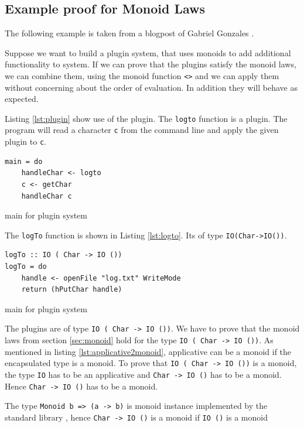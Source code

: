 \documentclass[twoside, a4paper]{article}
\begin{document}
\subsection{Example proof for Monoid Laws}
\label{sec:example}

The following example is taken from a blogpost of Gabriel Gonzales \cite{gonzales14}. 

Suppose we want to build a plugin system, that uses monoids to add additional functionality to system. If we can prove that the plugins satisfy the monoid laws, we can combine them, using the monoid function \verb|<>| and we can apply them without concerning about the order of evaluation. In addition they will behave as expected. 

Listing \ref{lst:plugin} show use of the plugin. The \verb|logto| function is a plugin. The program will read a character \verb|c| from the command line and apply the given plugin to \verb|c|.

\begin{program}
\begin{verbatim}
main = do
    handleChar <- logto
    c <- getChar
    handleChar c
\end{verbatim}
\label{lst:plugin}
\caption{main for plugin system}
\end{program}

The \verb|logTo| function is shown in Listing \ref{lst:logto}. Its of type \verb|IO(Char->IO())|. 

\begin{program}
\begin{verbatim}
logTo :: IO ( Char -> IO ())
logTo = do
    handle <- openFile "log.txt" WriteMode
    return (hPutChar handle)
\end{verbatim}
\label{lst:logto}
\caption{main for plugin system}
\end{program}

The plugins are of type \verb|IO ( Char -> IO ())|. We have to  prove that the monoid laws from section \ref{sec:monoid} hold for the type \verb|IO ( Char -> IO ())|.
As mentioned in listing \ref{lst:applicative2monoid}, applicative can be a monoid if the encapsulated type is a monoid. To prove that \verb|IO ( Char -> IO ())| is a monoid, the type \verb|IO| has to be an applicative and \verb|Char -> IO ()| has to be a monoid. Hence \verb|Char -> IO ()| has to be a monoid.

The type \verb|Monoid b => (a -> b)| is monoid instance implemented by the standard library \cite{monoid}, hence \verb|Char -> IO ()| is a monoid if \verb|IO ()| is a monoid
\end{document}
